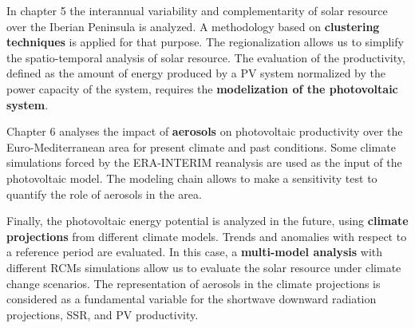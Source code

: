   In chapter 5 the interannual variability and complementarity of solar resource over the Iberian Peninsula is analyzed. A methodology based on \textbf{clustering techniques} is applied for that purpose. The regionalization allows us to simplify the spatio-temporal analysis of solar resource. The evaluation of the productivity, defined as the amount of energy produced by a PV system normalized by the power capacity of the system, requires the \textbf{modelization of the photovoltaic system}.
  
  Chapter 6 analyses the impact of \textbf{aerosols} on photovoltaic productivity over the Euro-Mediterranean area for present climate and past conditions.  Some climate simulations forced by the ERA-INTERIM reanalysis are used as the input of the photovoltaic model. The modeling chain allows to make a sensitivity test to quantify the role of aerosols in the area.

  
  Finally, the photovoltaic energy potential is analyzed in the future, using \textbf{climate projections} from different climate models. Trends and anomalies with respect to a reference period are evaluated. In this case, a \textbf{multi-model analysis} with different RCMs simulations allow us to evaluate the solar resource under climate change scenarios. The representation of aerosols in the climate projections is considered as a fundamental variable for the shortwave downward radiation projections, SSR, and PV productivity.

  

